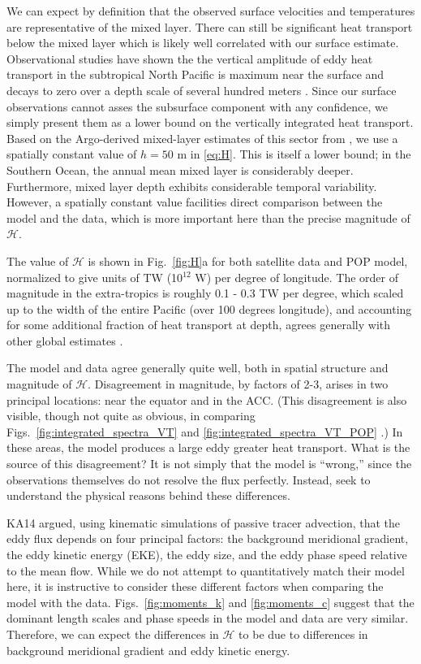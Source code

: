 \documentclass[10pt]{article}
\begin{document}
We can expect by definition that the observed surface velocities and temperatures are representative of the mixed layer. There can still be significant heat transport below the mixed layer which is likely well correlated with our surface estimate. Observational studies have shown the the vertical amplitude of eddy heat transport in the subtropical North Pacific is maximum near the surface and decays to zero over a depth scale of several hundred meters \citep{RoemmichGilson2001,QiuChen2005}. Since our surface observations cannot asses the subsurface component with any confidence, we simply present them as a lower bound on the vertically integrated heat transport. Based on the Argo-derived mixed-layer estimates of this sector from \citet{HolteTalley2009}, we use a spatially constant value of $h = 50$ m in \eqref{eq:H}. This is itself a lower bound; in the Southern Ocean, the annual mean mixed layer is considerably deeper. Furthermore, mixed layer depth exhibits considerable temporal variability. However, a spatially constant value facilities direct comparison between the model and the data, which is more important here than the precise magnitude of $\mathcal{H}$.

The value of $\mathcal{H}$ is shown in Fig.~\ref{fig:H}a for both satellite data and POP model, normalized to give units of TW (10$^{12}$ W) per degree of longitude. The order of magnitude in the extra-tropics is roughly 0.1 - 0.3 TW per degree, which scaled up to the width of the entire Pacific (over 100 degrees longitude), and accounting for some additional fraction of heat transport at depth, agrees generally with other global estimates \citep{JayneMarotzke2002,VolkovEtAl2008,DongEtAl2014}. 

The model and data agree generally quite well, both in spatial structure and magnitude of $\mathcal{H}$. Disagreement in magnitude, by factors of 2-3, arises in two principal locations: near the equator and in the ACC. (This disagreement is also visible, though not quite as obvious, in comparing Figs.~\ref{fig:integrated_spectra_VT} and \ref{fig:integrated_spectra_VT_POP} .) In these areas, the model produces a large eddy greater heat transport. What is the source of this disagreement? It is not simply that the model is ``wrong,'' since the observations themselves do not resolve the flux perfectly. Instead, seek to understand the physical reasons behind these differences.

KA14 argued, using kinematic simulations of passive tracer advection, that the eddy flux depends on four principal factors: the background meridional gradient, the eddy kinetic energy (EKE), the eddy size, and the eddy phase speed relative to the mean flow. While we do not attempt to quantitatively match their model here, it is instructive to consider these different factors when comparing the model with the data. Figs.~\ref{fig:moments_k} and \ref{fig:moments_c} suggest that the dominant length scales and phase speeds in the model and data are very similar. Therefore, we can expect the differences in $\mathcal{H}$ to be due to differences in background meridional gradient and eddy kinetic energy. 
\end{document}
